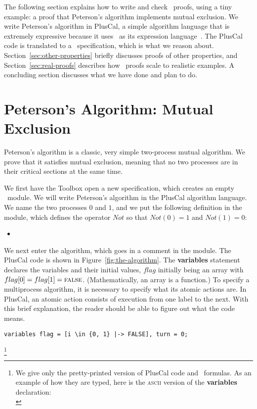 \documentclass[a4paper]{llncs}
\renewcommand{\ELSE}{\settowidth{\symlength}{\THEN}%
   \makebox[\symlength][l]{\textsc{ else}}}
\renewcommand{\FALSE}{\textsc{false}}
\renewcommand{\IF}{\textsc{if }}
\renewcommand{\THEN}{\textsc{ then }}
\def\S#1{\hspace*{#1em}}
\newenvironment{display}{\begin{itemize}\item[]}{\end{itemize}}
\begin{document}
The following section explains how to write and check \tlaplus\ proofs,
using a tiny example: a proof that Peterson's algorithm implements
mutual exclusion.  We write Peterson's algorithm in PlusCal, a
simple algorithm language that is extremely expressive because it uses
\tlaplus\ as its expression language~\cite{lamport:pluscal}.  The
PlusCal code is translated to a \tlaplus\ specification, which is what
we reason about.  Section~\ref{sec:other-properties} briefly discusses
proofs of other properties, and Section~\ref{sec:real-proofs}
describes how \tlaplus\ proofs scale to realistic examples.  A
concluding section discusses what we have done and plan to do.


\section{Peterson's Algorithm: Mutual Exclusion}
\label{sec:peterson-mutex}

Peterson's algorithm \cite{peterson:myths} is a classic, very simple
two-process mutual algorithm.  We prove that it satisfies mutual
exclusion, meaning that no two processes are in their critical sections
at the same time.

We first have the Toolbox open a new specification, which creates an
empty \tlaplus\ module.  We will write Peterson's algorithm in the
PlusCal algorithm language.  We name the two processes $0$ and $1$,
and we put the following definition in the module, which defines the
operator $Not$ so that $Not(0)=1$ and \mbox{$Not(1)=0$}:
\begin{display}
\begin{tlatex}
\@x{ Not ( i ) \.{\defeq}\, {\IF} i \.{=} 0 \.{\THEN} 1 \.{\ELSE} 0}%
\end{tlatex}
\end{display}
%
We next enter the algorithm, which goes in a comment in the module.
The PlusCal code is shown in Figure~\ref{fig:the-algorithm}.  The
\textbf{variables} statement declares the variables and their initial
values, $flag$ initially being an array with $flag[0]=flag[1]=\FALSE$.
(Mathematically, an array is a function.)  To specify a multiprocess
algorithm, it is necessary to specify what its atomic actions are.  In
PlusCal, an atomic action consists of execution from one label to the
next.  With this brief explanation, the reader should be able to
figure out what the code means.%
%
\newsavebox{\fnbox}%
\begin{lrbox}{\fnbox}
\footnotesize
\verb/variables flag = [i \in {0, 1} |-> FALSE], turn = 0;/
\end{lrbox}%
%
\footnote{We give only the pretty-printed version of PlusCal code
and \tlaplus\ formulas.  As an example of how they are typed,
here is the \textsc{ascii} version of the \textbf{variables}
declaration:\\[.25em]
\S{2}\usebox{\fnbox}}
%
\end{document}
